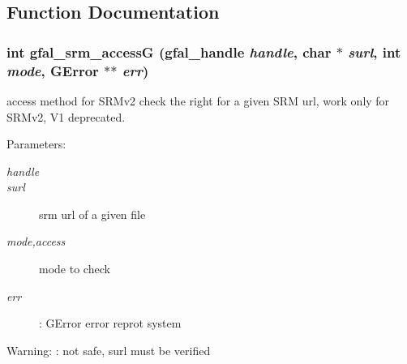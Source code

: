 \subsection{Function Documentation}
\subsubsection{\setlength{\rightskip}{0pt plus 5cm}int gfal\_\-srm\_\-access\-G (gfal\_\-handle {\em handle}, char $\ast$ {\em surl}, int {\em mode}, GError $\ast$$\ast$ {\em err})}\label{gfal__common__srm__access_8c_e32a5d03243ee2f17e43fadc4c421612}


access method for SRMv2 check the right for a given SRM url, work only for SRMv2, V1 deprecated. 

\begin{Desc}
\item[Parameters:]
\begin{description}
\item[{\em handle}]\item[{\em surl}]srm url of a given file \item[{\em mode,access}]mode to check \item[{\em err}]: GError error reprot system \end{description}
\end{Desc}
\begin{Desc}
\item[Warning:]: not safe, surl must be verified \end{Desc}
